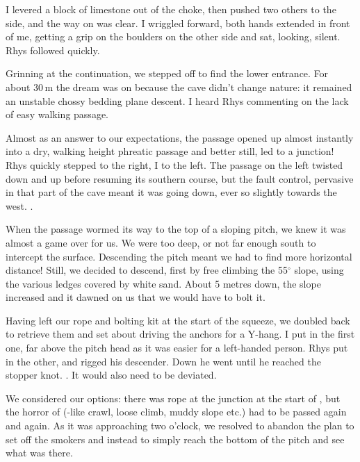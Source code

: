 I levered a block of limestone out of the choke, then pushed two others to the side, and the way on was clear. I wriggled forward, both hands extended in front of me, getting a grip on the boulders on the other side and sat, looking, silent. Rhys followed quickly.

Grinning at the continuation, we stepped off to find the lower entrance. For about 30\,m the dream was on because the cave didn't change nature: it remained an unstable chossy bedding plane descent. I heard Rhys commenting on the lack of easy walking passage.

Almost as an answer to our expectations, the passage opened up almost instantly into a dry, walking height phreatic passage and better still, led to a junction! Rhys quickly stepped to the right, I to the left. The passage on the left twisted down and up before resuming its southern course, but the fault control, pervasive in that part of the cave meant it was going down, ever so slightly towards the west. .

When the passage wormed its way to the top of a sloping pitch, we knew it was almost a game over for us. We were too deep, or not far enough south to intercept the surface. Descending the pitch meant we had to find more horizontal distance! Still, we decided to descend, first by free climbing the 55$^{\circ}$  slope, using the various ledges covered by white sand. About 5 metres down, the slope increased and it dawned on us that we would have to bolt it.

Having left our rope and bolting kit at the start of the squeeze, we doubled back to retrieve them and set about driving the anchors for a Y-hang. I put in the first one, far above the pitch head as it was easier for a left-handed person. Rhys put in the other, and rigged his descender. Down he went until he reached the stopper knot. . It would also need to be deviated.

We considered our options: there was rope at the junction at the start of , but the horror of  (-like crawl, loose climb, muddy slope etc.) had to be passed again and again. As it was approaching two o'clock, we resolved to abandon the plan to set off the smokers and instead to simply reach the bottom of the pitch and see what was there.

